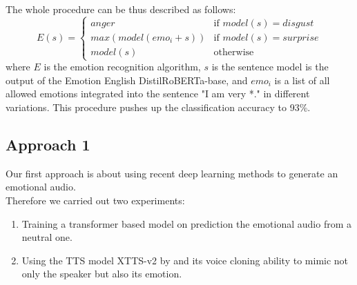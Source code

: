 \documentclass[11pt]{article}
\begin{document}
The whole procedure can be thus described as follows:
{
\small
\begin{equation*}
E(s)=\begin{cases}
  anger & \text{if } model(s)=disgust\\      
  max(model(emo_i+s)) & \text{if }  model(s)=surprise\\
  model(s) & \text{otherwise } 
\end{cases}
\end{equation*}
}
where $E$ is the emotion recognition algorithm, $s$ is the sentence model is the output of the Emotion English DistilRoBERTa-base, and $emo_i$ is a list of all allowed emotions integrated into the sentence "I am very *." in different variations.
This procedure pushes up the classification accuracy to 93\%.

\subsection{Approach 1}
Our first approach is about using recent deep learning methods to generate an emotional audio. \\
Therefore we carried out two experiments:
\begin{enumerate}
	\item \label{Experiment 1} Training a transformer based model on prediction the emotional audio from a neutral one.
	\item \label{Experiment 2} Using the TTS model XTTS-v2 by \cite{casanova2024xtts} and its voice cloning ability to mimic not only the speaker but also its emotion.
\end{enumerate}
\end{document}

